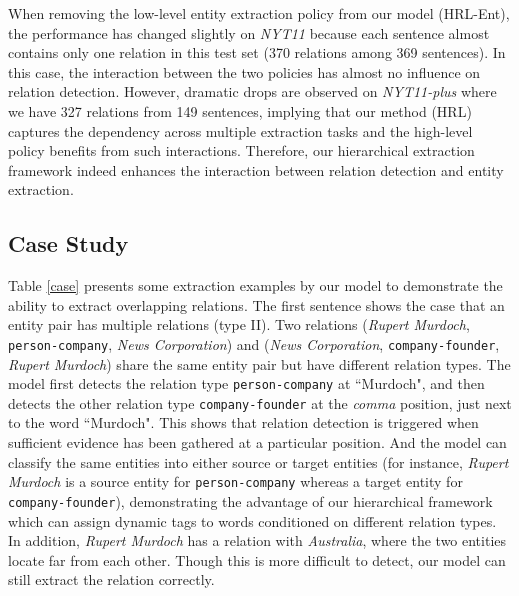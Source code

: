\documentclass[letterpaper]{article} %
\theoremstyle{definition}
\begin{document}
When removing the low-level entity extraction policy from our model (HRL-Ent), the performance has changed slightly on \textit{NYT11} because each sentence almost contains only one relation in this test set (370 relations among 369 sentences). 
In this case, the interaction between the two policies has almost no influence on relation detection. However, dramatic drops are observed on \textit{NYT11-plus} where we have 327 relations from 149 sentences, implying that our method (HRL) captures the dependency across multiple extraction tasks and the high-level policy benefits from such interactions. Therefore, our hierarchical extraction framework indeed enhances the interaction between relation detection and entity extraction.

\subsection{Case Study}


Table \ref{case} presents some extraction examples by our model to demonstrate the ability to extract overlapping relations. The first sentence shows the case that an entity pair has multiple relations (type II). Two relations (\textit{Rupert Murdoch}, \texttt{person-company}, \textit{News Corporation}) and (\textit{News Corporation}, \texttt{company-founder}, \textit{Rupert Murdoch}) share the same entity pair but have different relation types. The model first detects the relation type \texttt{person-company} at ``Murdoch", and then detects the other relation type \texttt{company-founder} at the \textit{comma} position, just next to the word ``Murdoch". This shows that relation detection is triggered when sufficient evidence has been gathered at a particular position. 
And the model can classify the same entities into either source or target entities (for instance, \textit{Rupert Murdoch} is a source entity for \texttt{person-company} whereas a target entity for \texttt{company-founder}), demonstrating the advantage of our hierarchical framework which can assign dynamic tags to words conditioned on different relation types.
In addition, \textit{Rupert Murdoch} has a relation with \textit{Australia}, where the two entities locate far from each other. Though this is more difficult to detect, our model can still extract the relation correctly.
\end{document}
